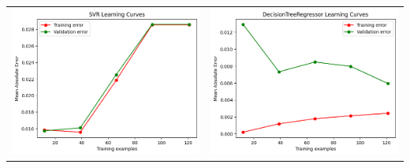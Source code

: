 \begin{table}[H]
    \centering
    \begin{tabular}{c c}
        \includegraphics[scale=0.3]{images/SVR_lc.png} & \includegraphics[scale=0.3]{images/DecisionTree_lc.png} \\

\end{tabular}
\end{table}
